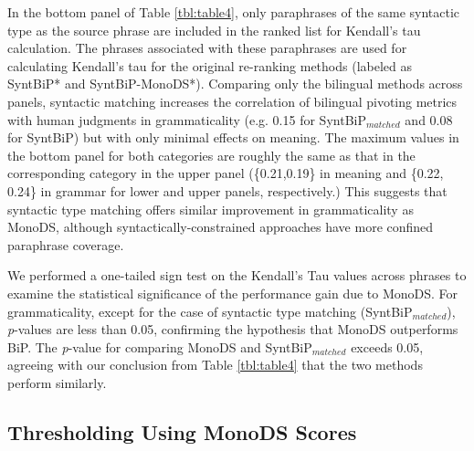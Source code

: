 \documentclass[11pt]{article}
\newcommand{\mnote}[1]{\marginpar{\raggedleft\footnotesize\itshape#1}}
\begin{document}
In the bottom panel of Table \ref{tbl:table4}, only paraphrases of the same syntactic type as the source phrase are included in the ranked list for Kendall's tau calculation. The phrases associated with these paraphrases are used for calculating Kendall's tau for the original re-ranking methods (labeled as SyntBiP* and SyntBiP-MonoDS*). Comparing only the bilingual methods across panels, syntactic matching increases the correlation of bilingual pivoting metrics with human judgments in grammaticality (e.g. 0.15 for SyntBiP$_{matched}$ and 0.08 for SyntBiP) but with only minimal effects on meaning. The maximum values in the bottom panel for both categories are roughly the same as that in the corresponding category in the upper panel (\{0.21,0.19\} in meaning and \{0.22, 0.24\} in grammar for lower and upper panels, respectively.) This suggests that syntactic type matching offers similar improvement in grammaticality as MonoDS, although syntactically-constrained approaches have more confined paraphrase coverage.

We performed a one-tailed sign test on the Kendall's Tau values across phrases to examine the statistical significance of the performance gain due to MonoDS. For grammaticality, except for the case of syntactic type matching (SyntBiP$_{matched}$), \emph{p}-values are less than 0.05, confirming the hypothesis that MonoDS outperforms BiP. The \emph{p}-value for comparing MonoDS and SyntBiP$_{matched}$ exceeds 0.05, agreeing with our conclusion from Table \ref{tbl:table4} that the two methods perform similarly.

\subsection{Thresholding Using MonoDS Scores}
\end{document}
